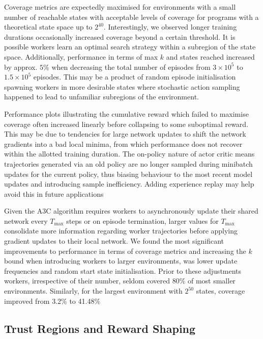 \documentclass[conference,compsoc]{IEEEtran}
\begin{document}
Coverage metrics are expectedly maximised for environments with a small number of reachable states with acceptable levels of coverage for programs with a theoretical state space up to $2^{40}$. Interestingly, we observed longer training durations occasionally increased coverage beyond a certain threshold. It is possible workers learn an optimal search strategy within a subregion of the state space. Additionally, performance in terms of max $k$ and states reached increased by approx. $5\%$ when decreasing the total number of episodes from $3 \times 10^{5}$ to $1.5\times10^{5}$ episodes. This may be a product of random episode initialisation spawning workers in more desirable states where stochastic action sampling happened to lead to unfamiliar subregions of the environment.

Performance plots illustrating the cumulative reward  which failed to maximise coverage often increased linearly before collapsing to some suboptimal reward. This may be due to tendencies for large network updates to shift the network gradients into a bad local minima, from which performance does not recover within the allotted training duration. The on-policy nature of actor critic means trajectories generated via an old policy are no longer sampled during minibatch updates for the current policy,  thus biasing behaviour to the most recent model updates and introducing sample inefficiency. Adding experience replay \cite{wang2017sample} may help avoid this in future applications

Given the A3C algorithm requires workers to asynchronously update their shared network every $T_{\max}$ steps or on episode termination, larger values for $T_{\max}$ consolidate more information regarding worker trajectories before applying gradient updates to their local network. We found the most significant improvements to performance in terms of coverage metrics and increasing the $k$ bound when introducing workers to larger environments, was lower update frequencies and random start state initialisation. Prior to these adjustments workers, irrespective of their number, seldom covered 80\% of most smaller environments. Similarly, for the largest environment with $2^{50}$ states, coverage improved from 3.2\% to 41.48\%

\subsection{Trust Regions and Reward Shaping}
\end{document}
